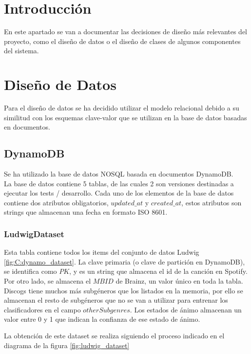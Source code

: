 
\section{Introducción}

En este apartado se van a documentar las decisiones de diseño más relevantes del proyecto, como el diseño de datos o el diseño de clases de algunos componentes del sistema. 

\section{Diseño de Datos}
Para el diseño de datos se ha decidido utilizar el modelo relacional debido a su similitud con los esquemas clave-valor que se utilizan en la base de datos basadas en documentos.


\subsection{DynamoDB}

Se ha utilizado la base de datos NOSQL basada en documentos DynamoDB.\\
La base de datos contiene 5 tablas, de las cuales 2 son versiones destinadas a ejecutar los tests / desarrollo. Cada uno de los elementos de la base de datos contiene dos atributos obligatorios, $updated\_at$ y $created\_at$, estos atributos son strings que almacenan una fecha en formato ISO 8601. 

\subsubsection{LudwigDataset}
Esta tabla contiene todos los items del conjunto de datos Ludwig \ref{fig:C:dynamo_dataset}. La clave primaria (o clave de partición en DynamoDB), se identifica como $PK$, y es un string que almacena el id de la canción en Spotify. Por otro lado, se almacena el $MBID$ de Brainz, un valor único en toda la tabla. Discogs \cite{C:a2022_discogs} tiene muchos más subgéneros que los listados en la memoria, por ello se almacenan el resto de subgéneros que no se van a utilizar para entrenar los clasificadores en el campo $otherSubgenres$. Los estados de ánimo almacenan un valor entre 0 y 1 que indican la confianza de ese estado de ánimo. 

La obtención de este dataset se realiza siguiendo el proceso indicado en el diagrama de la figura \ref{fig:ludwig_dataset}


